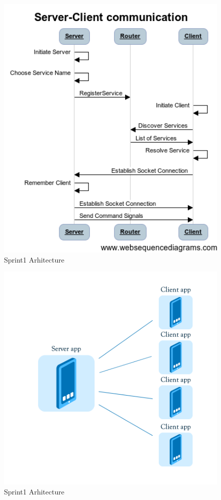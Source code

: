 \begin{figure}[!t]
	\centering
		\includegraphics[width=16cm]{sprint1/Server-Client communication.png}
	\caption{Sprint1 Arhitecture}
	\label{fig:sprint1_arhitecture}
\end{figure}


\begin{figure}[!t]
	\centering
		\includegraphics[width=16cm]{sprint1/arhitecture.png}
	\caption{Sprint1 Arhitecture}
	\label{fig:sprint1_arhitecture}
\end{figure}

